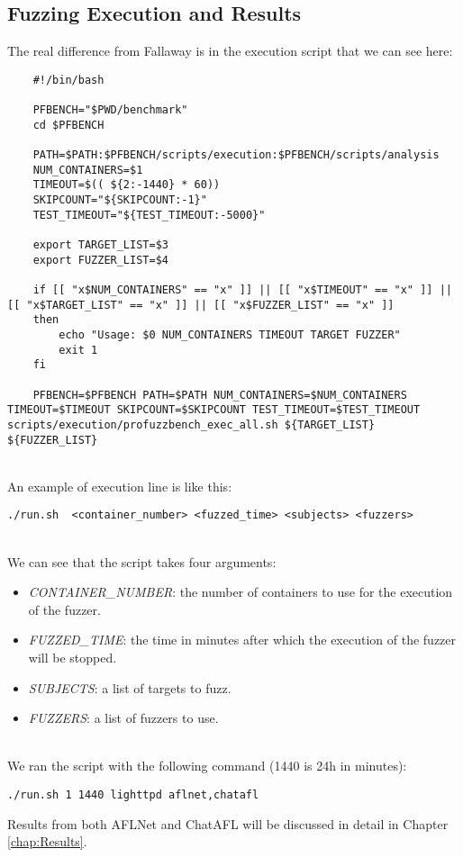 \subsection{Fuzzing Execution and Results}

The real difference from Fallaway is in the execution script that we can see here:\\
\begin{lstlisting}
    #!/bin/bash

    PFBENCH="$PWD/benchmark"
    cd $PFBENCH

    PATH=$PATH:$PFBENCH/scripts/execution:$PFBENCH/scripts/analysis
    NUM_CONTAINERS=$1
    TIMEOUT=$(( ${2:-1440} * 60))
    SKIPCOUNT="${SKIPCOUNT:-1}"
    TEST_TIMEOUT="${TEST_TIMEOUT:-5000}"

    export TARGET_LIST=$3
    export FUZZER_LIST=$4

    if [[ "x$NUM_CONTAINERS" == "x" ]] || [[ "x$TIMEOUT" == "x" ]] || [[ "x$TARGET_LIST" == "x" ]] || [[ "x$FUZZER_LIST" == "x" ]]
    then
        echo "Usage: $0 NUM_CONTAINERS TIMEOUT TARGET FUZZER"
        exit 1
    fi

    PFBENCH=$PFBENCH PATH=$PATH NUM_CONTAINERS=$NUM_CONTAINERS TIMEOUT=$TIMEOUT SKIPCOUNT=$SKIPCOUNT TEST_TIMEOUT=$TEST_TIMEOUT scripts/execution/profuzzbench_exec_all.sh ${TARGET_LIST} ${FUZZER_LIST}
\end{lstlisting}
\phantom{}\\
An example of execution line is like this:\\
\begin{lstlisting}
./run.sh  <container_number> <fuzzed_time> <subjects> <fuzzers>
\end{lstlisting}
\phantom{}\\
We can see that the script takes four arguments:\\
\begin{itemize}
    \item \textit{CONTAINER\_NUMBER}: the number of containers to use for the execution of the fuzzer.
    \item \textit{FUZZED\_TIME}: the time in minutes after which the execution of the fuzzer will be stopped.
    \item \textit{SUBJECTS}: a list of targets to fuzz.
    \item \textit{FUZZERS}: a list of fuzzers to use.
\end{itemize}
\phantom{}\\
We ran the script with the following command (1440 is 24h in minutes):
\begin{lstlisting}
./run.sh 1 1440 lighttpd aflnet,chatafl
\end{lstlisting}
Results from both AFLNet and ChatAFL will be discussed in detail in Chapter \ref{chap:Results}.